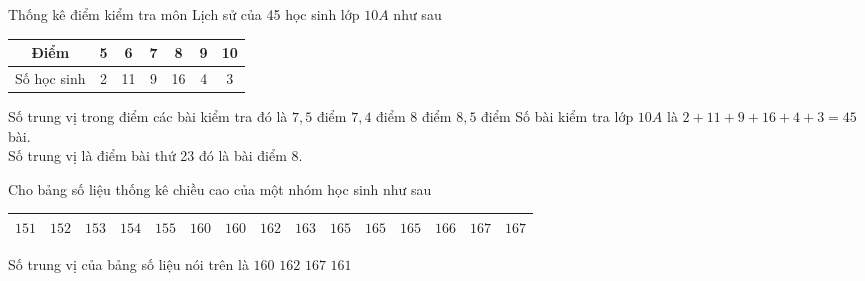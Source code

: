 \begin{ex}%
	Thống kê điểm kiểm tra môn Lịch sử của 45 học sinh lớp $ 10A $ như sau
	\begin{center}
		\begin{tabular}{|c|c|c|c|c|c|c|}
			\hline
			Điểm & 5 & 6 & 7 & 8 & 9 & 10 \\
			\hline
			Số học sinh & 2 & 11 & 9 & 16 & 4 & 3 \\
			\hline
		\end{tabular}
	\end{center}
	Số trung vị trong điểm các bài kiểm tra đó là
	\choice
	{$ 7{,}5 $ điểm}
	{$ 7{,}4 $ điểm}
	{\True $ 8 $ điểm}
	{$ 8{,}5 $ điểm}
	\loigiai
	{Số bài kiểm tra lớp $ 10A $ là $ 2+11+9+16+4+3=45 $ bài.\\
		Số trung vị là điểm bài thứ 23 đó là bài điểm 8.
	}
\end{ex}
\begin{ex}%
	Cho bảng số liệu thống kê chiều cao của một nhóm học sinh như sau
	\begin{center}
		\begin{tabular}{|c|c|c|c|c|c|c|c|c|c|c|c|c|c|c|}
			\hline
			$151$	&$152$&$153$&$154$&$155$&$160$&$160$&$162$&$163$&$165$&$165$&$165$&$166$&$167$&$167$\\
			\hline
		\end{tabular}
	\end{center}
	Số trung vị của bảng số liệu nói trên là
	\choice
	{$160$}
	{\True $162$}
	{$167$}
	{$161$}
\end{ex}

